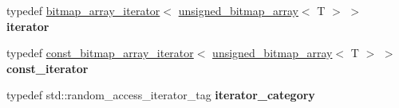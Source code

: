 \begin{DoxyCompactItemize}
typedef \hyperlink{classdialog_1_1bitmap__array__iterator}{bitmap\+\_\+array\+\_\+iterator}$<$ \hyperlink{classdialog_1_1unsigned__bitmap__array}{unsigned\+\_\+bitmap\+\_\+array}$<$ T $>$ $>$ {\bfseries iterator}
\item 
\mbox{\label{classdialog_1_1unsigned__bitmap__array_a92ee64730c694bde54130c1b3cad8b1e}} 
typedef \hyperlink{classdialog_1_1const__bitmap__array__iterator}{const\+\_\+bitmap\+\_\+array\+\_\+iterator}$<$ \hyperlink{classdialog_1_1unsigned__bitmap__array}{unsigned\+\_\+bitmap\+\_\+array}$<$ T $>$ $>$ {\bfseries const\+\_\+iterator}
\item 
\mbox{\label{classdialog_1_1unsigned__bitmap__array_a1c3d2c473aee2a4738912d2bcf1a13fd}} 
typedef std\+::random\+\_\+access\+\_\+iterator\+\_\+tag {\bfseries iterator\+\_\+category}
\end{DoxyCompactItemize}
